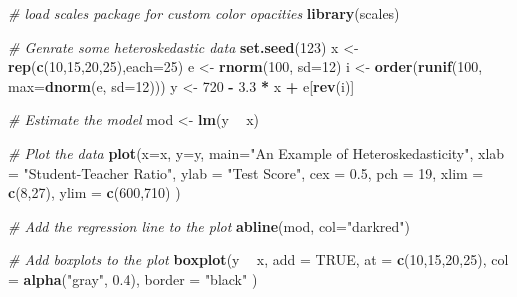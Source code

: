 \documentclass[]{book}
\newenvironment{Shaded}{\begin{snugshade}}{\end{snugshade}}
\newcommand{\KeywordTok}[1]{\textcolor[rgb]{0.13,0.29,0.53}{\textbf{#1}}}
\newcommand{\DataTypeTok}[1]{\textcolor[rgb]{0.13,0.29,0.53}{#1}}
\newcommand{\DecValTok}[1]{\textcolor[rgb]{0.00,0.00,0.81}{#1}}
\newcommand{\FloatTok}[1]{\textcolor[rgb]{0.00,0.00,0.81}{#1}}
\newcommand{\StringTok}[1]{\textcolor[rgb]{0.31,0.60,0.02}{#1}}
\newcommand{\CommentTok}[1]{\textcolor[rgb]{0.56,0.35,0.01}{\textit{#1}}}
\newcommand{\OtherTok}[1]{\textcolor[rgb]{0.56,0.35,0.01}{#1}}
\newcommand{\OperatorTok}[1]{\textcolor[rgb]{0.81,0.36,0.00}{\textbf{#1}}}
\newcommand{\NormalTok}[1]{#1}
\theoremstyle{definition}
\theoremstyle{definition}
\theoremstyle{definition}
\theoremstyle{remark}
\begin{document}
\begin{Shaded}
\begin{Highlighting}[]
\CommentTok{# load scales package for custom color opacities}
\KeywordTok{library}\NormalTok{(scales)}

\CommentTok{# Genrate some heteroskedastic data}
\KeywordTok{set.seed}\NormalTok{(}\DecValTok{123}\NormalTok{) }
\NormalTok{x <-}\StringTok{ }\KeywordTok{rep}\NormalTok{(}\KeywordTok{c}\NormalTok{(}\DecValTok{10}\NormalTok{,}\DecValTok{15}\NormalTok{,}\DecValTok{20}\NormalTok{,}\DecValTok{25}\NormalTok{),}\DataTypeTok{each=}\DecValTok{25}\NormalTok{)}
\NormalTok{e <-}\StringTok{ }\KeywordTok{rnorm}\NormalTok{(}\DecValTok{100}\NormalTok{, }\DataTypeTok{sd=}\DecValTok{12}\NormalTok{)                }
\NormalTok{i <-}\StringTok{ }\KeywordTok{order}\NormalTok{(}\KeywordTok{runif}\NormalTok{(}\DecValTok{100}\NormalTok{, }\DataTypeTok{max=}\KeywordTok{dnorm}\NormalTok{(e, }\DataTypeTok{sd=}\DecValTok{12}\NormalTok{))) }
\NormalTok{y <-}\StringTok{ }\DecValTok{720} \OperatorTok{-}\StringTok{ }\FloatTok{3.3} \OperatorTok{*}\StringTok{ }\NormalTok{x }\OperatorTok{+}\StringTok{ }\NormalTok{e[}\KeywordTok{rev}\NormalTok{(i)]}

\CommentTok{# Estimate the model }
\NormalTok{mod <-}\StringTok{ }\KeywordTok{lm}\NormalTok{(y }\OperatorTok{~}\StringTok{ }\NormalTok{x)}

\CommentTok{# Plot the data}
\KeywordTok{plot}\NormalTok{(}\DataTypeTok{x=}\NormalTok{x, }
     \DataTypeTok{y=}\NormalTok{y, }
     \DataTypeTok{main=}\StringTok{"An Example of Heteroskedasticity"}\NormalTok{,}
     \DataTypeTok{xlab =} \StringTok{"Student-Teacher Ratio"}\NormalTok{,}
     \DataTypeTok{ylab =} \StringTok{"Test Score"}\NormalTok{,}
     \DataTypeTok{cex =} \FloatTok{0.5}\NormalTok{, }
     \DataTypeTok{pch =} \DecValTok{19}\NormalTok{, }
     \DataTypeTok{xlim =} \KeywordTok{c}\NormalTok{(}\DecValTok{8}\NormalTok{,}\DecValTok{27}\NormalTok{), }
     \DataTypeTok{ylim =} \KeywordTok{c}\NormalTok{(}\DecValTok{600}\NormalTok{,}\DecValTok{710}\NormalTok{)}
\NormalTok{     )}

\CommentTok{# Add the regression line to the plot}
\KeywordTok{abline}\NormalTok{(mod, }\DataTypeTok{col=}\StringTok{"darkred"}\NormalTok{)}

\CommentTok{# Add boxplots to the plot}
\KeywordTok{boxplot}\NormalTok{(y }\OperatorTok{~}\StringTok{ }\NormalTok{x, }
        \DataTypeTok{add =} \OtherTok{TRUE}\NormalTok{, }
        \DataTypeTok{at =} \KeywordTok{c}\NormalTok{(}\DecValTok{10}\NormalTok{,}\DecValTok{15}\NormalTok{,}\DecValTok{20}\NormalTok{,}\DecValTok{25}\NormalTok{), }
        \DataTypeTok{col =} \KeywordTok{alpha}\NormalTok{(}\StringTok{"gray"}\NormalTok{, }\FloatTok{0.4}\NormalTok{), }
        \DataTypeTok{border =} \StringTok{"black"}
\NormalTok{        )}
\end{Highlighting}
\end{Shaded}
\end{document}
